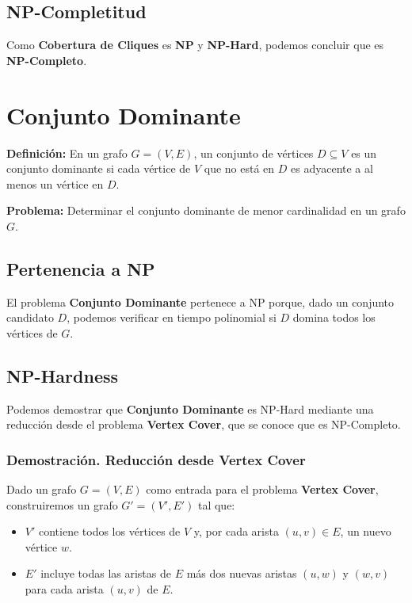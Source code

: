 \documentclass[a4paper,12pt]{article}
\begin{document}
\subsection{NP-Completitud}

Como \textbf{Cobertura de Cliques} es \textbf{NP} y \textbf{NP-Hard}, podemos concluir que es \textbf{NP-Completo}.



\section{Conjunto Dominante}


\textbf{Definici\'on:} En un grafo $G = (V, E)$, un conjunto de v\'ertices $D \subseteq V$ es un conjunto dominante si cada v\'ertice de $V$ que no est\'a en $D$ es adyacente a al menos un v\'ertice en $D$. 

\textbf{Problema:} Determinar el conjunto dominante de menor cardinalidad en un grafo $G$. 

\subsection{Pertenencia a NP}

El problema \textbf{Conjunto Dominante} pertenece a NP porque, dado un conjunto candidato $D$, podemos verificar en tiempo polinomial si $D$ domina todos los v\'ertices de $G$. 

\subsection{NP-Hardness}
Podemos demostrar que \textbf{Conjunto Dominante} es NP-Hard mediante una reducci\'on desde el problema \textbf{Vertex Cover}, que se conoce que es NP-Completo.

\subsubsection{Demostraci\'on. Reducci\'on desde Vertex Cover}
Dado un grafo $G = (V, E)$ como entrada para el problema \textbf{Vertex Cover}, construiremos un grafo $G' = (V', E')$ tal que:
\begin{itemize}
    \item $V'$ contiene todos los v\'ertices de $V$ y, por cada arista $(u, v) \in E$, un nuevo v\'ertice $w$.
    \item $E'$ incluye todas las aristas de $E$ m\'as dos nuevas aristas $(u, w)$ y $(w, v)$ para cada arista $(u, v)$ de $E$.
\end{itemize}
\end{document}

